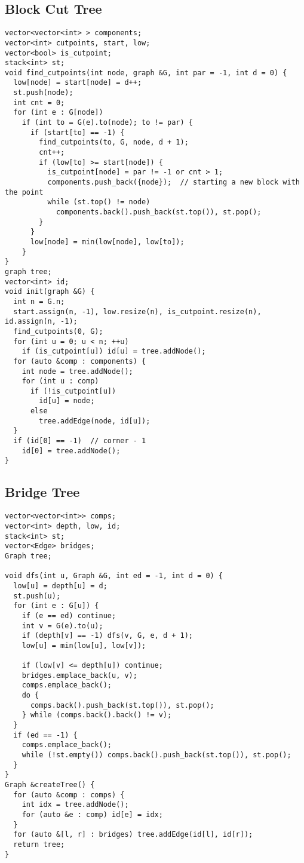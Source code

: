 \documentclass[FSZ,a4paper,onesided]{article}
\begin{document}
\begin{multicols*}{\COLS}
\subsection{Block Cut Tree}
\begin{lstlisting}
vector<vector<int> > components;
vector<int> cutpoints, start, low;
vector<bool> is_cutpoint;
stack<int> st;
void find_cutpoints(int node, graph &G, int par = -1, int d = 0) {
  low[node] = start[node] = d++;
  st.push(node);
  int cnt = 0;
  for (int e : G[node])
    if (int to = G(e).to(node); to != par) {
      if (start[to] == -1) {
        find_cutpoints(to, G, node, d + 1);
        cnt++;
        if (low[to] >= start[node]) {
          is_cutpoint[node] = par != -1 or cnt > 1;
          components.push_back({node});  // starting a new block with the point
          while (st.top() != node)
            components.back().push_back(st.top()), st.pop();
        }
      }
      low[node] = min(low[node], low[to]);
    }
}
graph tree;
vector<int> id;
void init(graph &G) {
  int n = G.n;
  start.assign(n, -1), low.resize(n), is_cutpoint.resize(n), id.assign(n, -1);
  find_cutpoints(0, G);
  for (int u = 0; u < n; ++u)
    if (is_cutpoint[u]) id[u] = tree.addNode();
  for (auto &comp : components) {
    int node = tree.addNode();
    for (int u : comp)
      if (!is_cutpoint[u])
        id[u] = node;
      else
        tree.addEdge(node, id[u]);
  }
  if (id[0] == -1)  // corner - 1
    id[0] = tree.addNode();
}
\end{lstlisting}
\subsection{Bridge Tree}
\begin{lstlisting}
vector<vector<int>> comps;
vector<int> depth, low, id;
stack<int> st;
vector<Edge> bridges;
Graph tree;

void dfs(int u, Graph &G, int ed = -1, int d = 0) {
  low[u] = depth[u] = d;
  st.push(u);
  for (int e : G[u]) {
    if (e == ed) continue;
    int v = G(e).to(u);
    if (depth[v] == -1) dfs(v, G, e, d + 1);
    low[u] = min(low[u], low[v]);

    if (low[v] <= depth[u]) continue;
    bridges.emplace_back(u, v);
    comps.emplace_back();
    do {
      comps.back().push_back(st.top()), st.pop();
    } while (comps.back().back() != v);
  }
  if (ed == -1) {
    comps.emplace_back();
    while (!st.empty()) comps.back().push_back(st.top()), st.pop();
  }
}
Graph &createTree() {
  for (auto &comp : comps) {
    int idx = tree.addNode();
    for (auto &e : comp) id[e] = idx;
  }
  for (auto &[l, r] : bridges) tree.addEdge(id[l], id[r]);
  return tree;
}


\end{lstlisting}
\end{multicols*}
\end{document}
